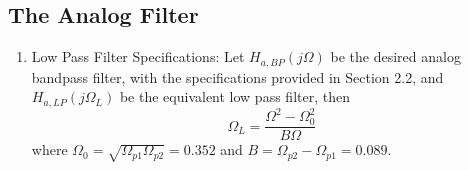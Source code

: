 \documentclass{article}
\begin{document}
\subsection{The Analog Filter}
\begin{enumerate}
\item {Low Pass Filter Specifications:}  Let $H_{a, BP}(j\Omega)$ be the desired analog bandpass filter,  with the specifications provided in Section 2.2, and $H_{a,LP}(j\Omega_L)$ be the equivalent low pass filter, then
          \begin{equation}
              \Omega_L = \frac{\Omega^2 - \Omega_0^2}{B\Omega} \label{eq:freq_transform}
          \end{equation}
          where $\Omega_0 = \sqrt{\Omega_{p1}\Omega_{p2}} = 0.352$ and $B = \Omega_{p2} - \Omega_{p1} = 0.089$.
          

\end{enumerate}
\end{document}
